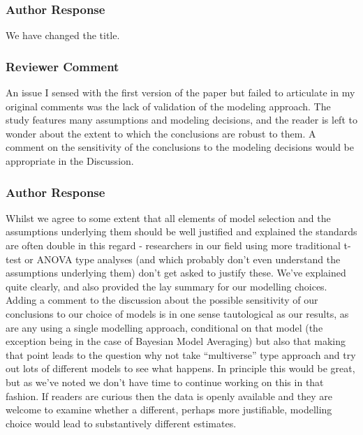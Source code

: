 \documentclass[
  letterpaper,
  DIV=11,
  numbers=noendperiod]{scrartcl}
\begin{document}
\hypertarget{author-response-11}{%
\subsubsection{Author Response}\label{author-response-11}}

We have changed the title.

\hypertarget{reviewer-comment-12}{%
\subsubsection{Reviewer Comment}\label{reviewer-comment-12}}

An issue I sensed with the first version of the paper but failed to
articulate in my original comments was the lack of validation of the
modeling approach. The study features many assumptions and modeling
decisions, and the reader is left to wonder about the extent to which
the conclusions are robust to them. A comment on the sensitivity of the
conclusions to the modeling decisions would be appropriate in the
Discussion.

\hypertarget{author-response-12}{%
\subsubsection{Author Response}\label{author-response-12}}

Whilst we agree to some extent that all elements of model selection and
the assumptions underlying them should be well justified and explained
the standards are often double in this regard - researchers in our field
using more traditional t-test or ANOVA type analyses (and which probably
don't even understand the assumptions underlying them) don't get asked
to justify these. We've explained quite clearly, and also provided the
lay summary for our modelling choices. Adding a comment to the
discussion about the possible sensitivity of our conclusions to our
choice of models is in one sense tautological as our results, as are any
using a single modelling approach, conditional on that model (the
exception being in the case of Bayesian Model Averaging) but also that
making that point leads to the question why not take ``multiverse'' type
approach and try out lots of different models to see what happens. In
principle this would be great, but as we've noted we don't have time to
continue working on this in that fashion. If readers are curious then
the data is openly available and they are welcome to examine whether a
different, perhaps more justifiable, modelling choice would lead to
substantively different estimates.
\end{document}
